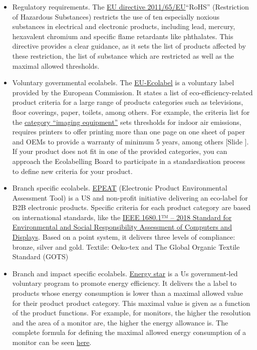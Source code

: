 \documentclass{article}
\newcounter{slide}
\begin{document}
\begin{itemize}
	\item Regulatory requirements. The \href{https://eur-lex.europa.eu/legal-content/EN/TXT/?qid=1399998664957&uri=CELEX:02011L0065-20140129}{EU directive 2011/65/EU}``RoHS'' (Restriction of Hazardous Substances) restricts the use of ten especially noxious substances in electrical and electronic products, including lead, mercury, hexavalent chromium and specific flame retardants like phthalates. This directive provides a clear guidance, as it sets the list of products affected by these restriction, the list of substance which are restricted as well as the maximal allowed thresholds.
	\item Voluntary governmental ecolabels. The \href{http://ec.europa.eu/environment/ecolabel/}{EU-Ecolabel} is a voluntary label provided by the European Commission. It states a list of eco-efficiency-related product criteria for a large range of products categories such as televisions, floor coverings, paper, toilets, among others. For example, the criteria list for the \href{https://eur-lex.europa.eu/LexUriServ/LexUriServ.do?uri=OJ:L:2013:353:0053:0063:EN:PDF}{category ``imaging equipment''} sets thresholds for indoor air emissions, requires printers to offer printing more than one page on one sheet of paper and OEMs to provide a warranty of minimum 5 years, among others {\color{blue}[Slide ]}. If your product does not fit in one of the provided categories, you can approach the Ecolabelling Board to participate in a standardisation process to define new criteria for your product. 
	\item Branch specific ecolabels. \href{http://greenelectronicscouncil.org/epeat/epeat-overview/}{EPEAT} (Electronic Product Environmental Assessment Tool) is a US and non-profit initiative delivering an eco-label for B2B electronic products. Specific criteria for each product category are based on international standards, like the \href{https://ieeexplore.ieee.org/document/8320570/}{IEEE 1680.1™ – 2018 Standard for Environmental and Social Responsibility Assessment of Computers and Displays}. Based on a point system, it delivers three levels of compliance: bronze, silver and gold. {\color{red}Textile: Oeko-tex and The Global Organic Textile Standard (GOTS)}
	\item Branch and impact specific ecolabels. \href{https://www.energystar.gov/}{Energy star} is a Us government-led voluntary program to promote energy efficiency. It delivers the a label to products whose energy consumption is lower than a maximal allowed value for their product product category. This maximal value is given as a function of the product functions. For example, for monitors, the higher the resolution and the area of a monitor are, the higher the energy allowance is. The complete formula for defining the maximal allowed energy consumption of a monitor can be seen \href{https://www.energystar.gov/products/office_equipment/displays/displays_key_product_criteria}{here}.
\end{itemize}
\end{document}

